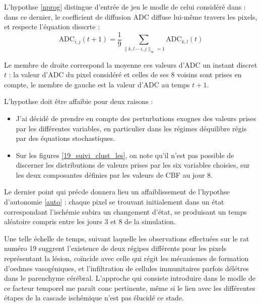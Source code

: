 L'hypothse \ref{nprog} distingue d'entr\'ee de jeu le modle de celui consid\'er\'e dans \cite{Duval_JCBFM_02} : %
dans ce dernier, le coefficient de diffusion ADC diffuse lui-m\^eme  travers les pixels, et respecte l'\'equation disscrte :
\[\text{ADC}_{i,j}(t+1)=\frac{1}{9}\sum\limits_{\|k,l-i,j\|_{\infty}=1}\text{ADC}_{k,l}(t)\]

Le membre de droite correspond  la moyenne ces valeurs d'ADC  un instant discret $t$ : %
la valeur d'ADC du pixel consid\'er\'e et celles de ses $8$ voisins sont prises en compte, %
le membre de gauche est la valeur d'ADC au temps $t+1$.

\par
L'hypothse \label{var_comp} doit \^etre affaibie pour deux raisons :
\begin{itemize}
\item J'ai d\'ecid\'e de prendre en compte des perturbations exognes des valeurs prises par les diff\'erentes variables, %
en particulier dans les r\'egimes d\'equilibre r\'egis par des \'equations stochastiques.
\item Sur les figures \ref{19_suivi_clust_les}, on note qu'il n'est pas possible de discerner les distributions de valeurs prises par les six variables choisies, %
sur les deux composantes d\'efinies par les valeurs de CBF au jour 8.
\end{itemize}

\par
Le dernier point qui pr\'ecde donnera lieu  un affaiblissement de l'hypothse d'autonomie \ref{auto} : %
chaque pixel se trouvant initialement dans un \'etat correspondant  l'isch\'emie subira un changement d'\'etat, %
se produisant  un temps al\'eatoire compris entre les jours 3 et 8 de la simulation.

\par
Une telle \'echelle de temps, suivant laquelle les observations effectu\'ees sur le rat num\'ero 19 %
suggrent l'existence de deux r\'egipes diff\'erents pour les pixels repr\'esentant la l\'esion, %
co\"incide avec celle qui r\'egit les m\'ecanismes de formation d'oedmes vasog\'eniques, %
et l'infiltration de cellules immunitaires parfois d\'el\'etres dans le parenchyme c\'er\'ebral. %
L'approche qui consiste  introduire dans le modle de ce facteur temporel me para\^it conc pertinente, %
m\^eme si le lien avec les diff\'erentes \'etapes de la cascade isch\'emique n'est pas \'elucid\'e  ce stade.

